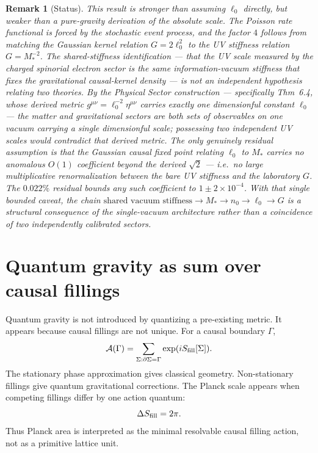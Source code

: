 \documentclass[11pt]{article}
\newtheorem{remark}[definition]{Remark}
\begin{document}
\begin{remark}[Status]
\label{rem:status}
This result is stronger than assuming $\ell_0$ directly, but weaker than a pure-gravity derivation of the absolute scale. The Poisson rate functional is forced by the stochastic event process, and the factor $4$ follows from matching the Gaussian kernel relation $G=2\ell_0^2$ to the UV stiffness relation $G=M_*^{-2}$. The shared-stiffness identification --- that the UV scale measured by the charged spinorial electron sector is the same information-vacuum stiffness that fixes the gravitational causal-kernel density --- is \emph{not} an independent hypothesis relating two theories. By the \emph{Physical Sector} construction --- specifically Thm~6.4, whose derived metric $g^{\mu\nu}=\ell_0^{-2}\eta^{\mu\nu}$ carries exactly one dimensionful constant $\ell_0$ --- the matter and gravitational sectors are both sets of observables on one vacuum carrying a single dimensionful scale; possessing two independent UV scales would contradict that derived metric. The only genuinely residual assumption is that the Gaussian causal fixed point relating $\ell_0$ to $M_*$ carries no anomalous $O(1)$ coefficient beyond the derived $\sqrt2$ --- i.e.\ no large multiplicative renormalization between the bare UV stiffness and the laboratory $G$. The $0.022\%$ residual bounds any such coefficient to $1\pm2\times10^{-4}$. With that single bounded caveat, the chain $\text{shared vacuum stiffness}\to M_*\to n_0\to\ell_0\to G$ is a structural consequence of the single-vacuum architecture rather than a coincidence of two independently calibrated sectors.
\end{remark}

\section{Quantum gravity as sum over causal fillings}

Quantum gravity is not introduced by quantizing a pre-existing metric. It appears because causal fillings are not unique. For a causal boundary $\Gamma$,
\begin{equation}
\mathcal A(\Gamma)=\sum_{\Sigma:\partial\Sigma=\Gamma}\exp(iS_{\rm fill}[\Sigma]).
\end{equation}
The stationary phase approximation gives classical geometry. Non-stationary fillings give quantum gravitational corrections.
The Planck scale appears when competing fillings differ by one action quantum:
\begin{equation}
\Delta S_{\rm fill}=2\pi.
\end{equation}
Thus Planck area is interpreted as the minimal resolvable causal filling action, not as a primitive lattice unit.
\end{document}
